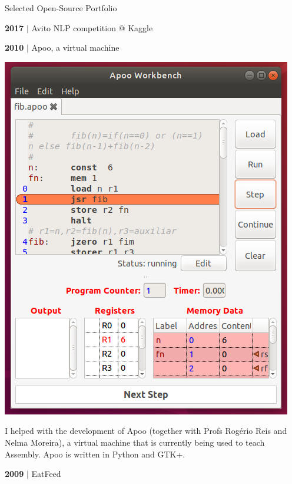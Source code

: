 \documentclass[11pt]{article}
\begin{document}
\bigskip
\centerline{\sc\large Selected Open-Source Portfolio}
\begin{multicols}{2}
\setlength{\columnseprule}{0.4pt}
\begin{samepage}\textbf{2017} $\vert$ Avito NLP competition @ Kaggle
\\\par\end{samepage}\begin{samepage}\textbf{2010} $\vert$ Apoo, a virtual machine
\\{\footnotesize\begin{minipage}{0.35\linewidth}\includegraphics[width=\linewidth]{imgs/cv-apoo.png}\end{minipage}\hfill\begin{minipage}{0.64\linewidth}I helped with the development of Apoo (together with Profs Rogério Reis and Nelma Moreira), a virtual machine that is currently being used to teach Assembly. Apoo is written in Python and GTK+.\end{minipage}}\par\end{samepage}\begin{samepage}\textbf{2009} $\vert$ EatFeed

\end{samepage}
\end{multicols}
\end{document}
